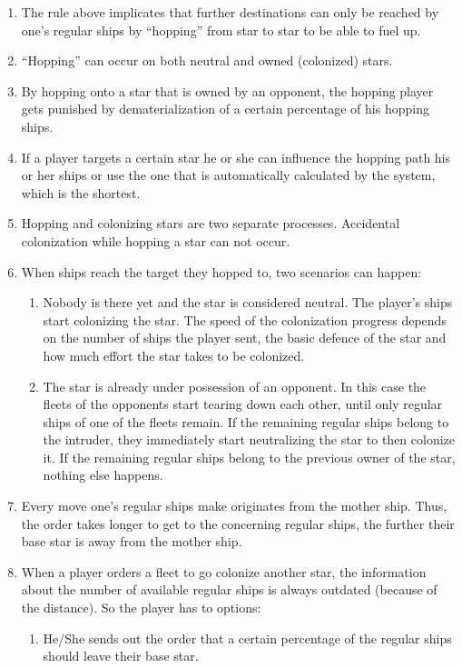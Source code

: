\begin{enumerate}
	\item The rule above implicates	that further destinations can only be reached by one's regular ships by ``hopping'' from star to star to be able to fuel up.
	\item ``Hopping'' can occur on both neutral and owned (colonized) stars.
	\item By hopping onto a star that is owned by an opponent, the hopping player gets punished by dematerialization of a certain percentage of his hopping ships.
	\item If a player targets a certain star he or she can influence the hopping path his or her ships or use the one that is automatically calculated by the system, which is the shortest.
	\item Hopping and colonizing stars are two separate processes. Accidental colonization while hopping a star can not occur.
	\item When ships reach the target they hopped to, two scenarios can happen:
		\begin{enumerate}[label=\alph*]
			\item Nobody is there yet and the star is considered neutral. The player's ships start colonizing the star. The speed of the colonization progress depends on the number of ships the player sent, the basic defence of the star and how much effort the star takes to be colonized.
			\item The star is already under possession of an opponent. In this case the fleets of the opponents start tearing down each other, until only regular ships of one of the fleets remain. If the remaining regular ships belong to the intruder, they immediately start neutralizing the star to then colonize it. If the remaining regular ships belong to the previous owner of the star, nothing else happens.
		\end{enumerate}
		\item Every move one's regular ships make originates from the mother ship. Thus, the order takes longer to get to the concerning regular ships, the further their base star is away from the mother ship.
	\item When a player orders a fleet to go colonize another star, the information about the number of available regular ships is always outdated (because of the distance). So the player has to options:
		\begin{enumerate}[label=\alph*]
			\item He/She sends out the order that a certain percentage of the regular ships should leave their base star.

\end{enumerate}
\end{enumerate}
